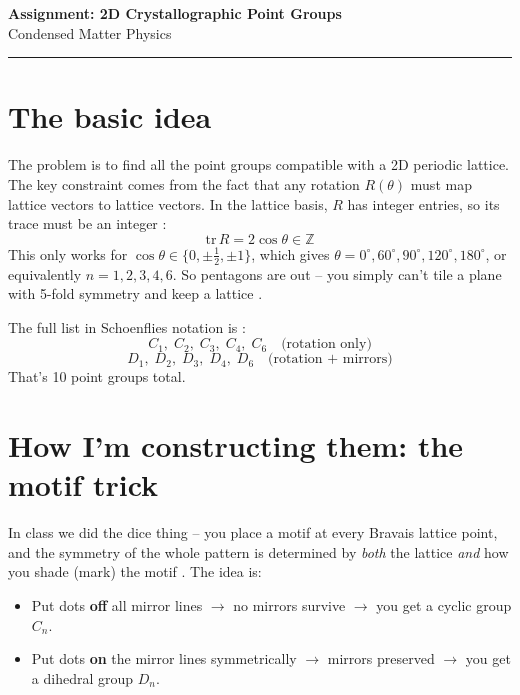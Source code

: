 \documentclass[12pt,a4paper]{article}
\begin{document}
\begin{center}
  {\Large \textbf{Assignment: 2D Crystallographic Point Groups}} \\[6pt]
  {\large Condensed Matter Physics}
\end{center}

\vspace{4pt}
\hrule
\vspace{10pt}

\section*{The basic idea}

The problem is to find all the point groups compatible with a 2D periodic lattice.
The key constraint comes from the fact that any rotation $R(\theta)$ must map lattice
vectors to lattice vectors. In the lattice basis, $R$ has integer entries, so its trace
must be an integer \cite{Kittel2005, Ashcroft1976}:
\[
  \mathrm{tr}\, R = 2\cos\theta \in \mathbb{Z}
\]
This only works for $\cos\theta \in \{0, \pm\tfrac{1}{2}, \pm 1\}$, which gives
$\theta = 0^\circ, 60^\circ, 90^\circ, 120^\circ, 180^\circ$, or equivalently
$n = 1, 2, 3, 4, 6$. So pentagons are out -- you simply can't tile a plane
with 5-fold symmetry and keep a lattice \cite{Kittel2005}.

The full list in Schoenflies notation is \cite{Bradley1972, Burns1990}:
\[
  C_1,\; C_2,\; C_3,\; C_4,\; C_6 \quad \text{(rotation only)}
\]
\[
  D_1,\; D_2,\; D_3,\; D_4,\; D_6 \quad \text{(rotation + mirrors)}
\]
That's 10 point groups total.

\section*{How I'm constructing them: the motif trick}

In class we did the dice thing -- you place a motif at every Bravais lattice point,
and the symmetry of the whole pattern is determined by \emph{both} the lattice
\emph{and} how you shade (mark) the motif \cite{Hammond2015}. The idea is:

\begin{itemize}
  \item Put dots \textbf{off} all mirror lines $\to$ no mirrors survive $\to$ you get a
        cyclic group $C_n$.
  \item Put dots \textbf{on} the mirror lines symmetrically $\to$ mirrors preserved
        $\to$ you get a dihedral group $D_n$.
\end{itemize}
\end{document}
